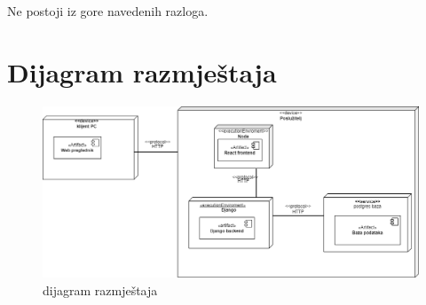 			 	Ne postoji iz gore navedenih razloga.
			
			\eject 
		
		
		\section{Dijagram razmještaja}
			
			
			
			\begin{figure}[H]
				\centering
				\includegraphics[scale=0.3]{dijagrami/Dijagram_razmjestaja.drawio.png}
				\caption{dijagram razmještaja}
				\label{fig:razmjestaj}
			\end{figure}
			
